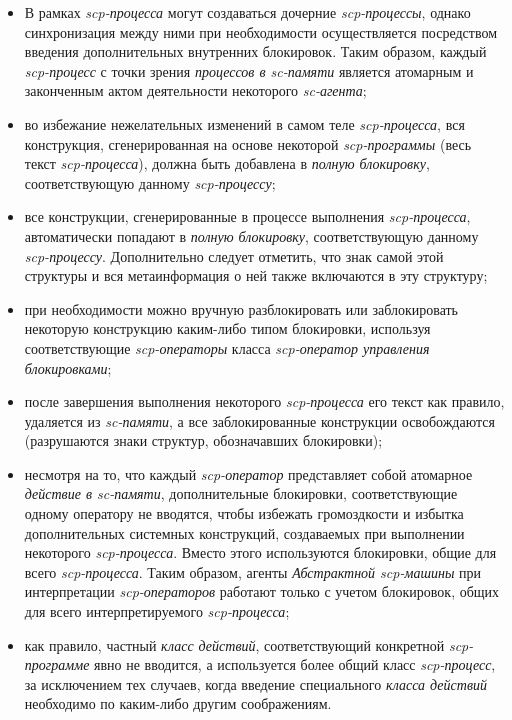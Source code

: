 \begin{frame}{}
\begin{itemize}
    \item В рамках \textit{scp-процесса} могут создаваться дочерние \textit{scp-процессы}, однако синхронизация между ними при необходимости осуществляется посредством введения дополнительных внутренних блокировок. Таким образом, каждый \textit{scp-процесс} с точки зрения \textit{процессов в sc-памяти} является атомарным и законченным актом деятельности некоторого \textit{sc-агента};
    \item во избежание нежелательных изменений в самом теле \textit{scp-процесса}, вся конструкция, сгенерированная на основе некоторой \textit{scp-программы} (весь текст \textit{scp-процесса}), должна быть добавлена в \textit{полную блокировку}, соответствующую данному \textit{scp-процессу};
\end{itemize}
\end{frame}

\begin{frame}{}
\begin{itemize}
\item все конструкции, сгенерированные в процессе выполнения \textit{scp-процесса}, автоматически попадают в \textit{полную 	блокировку}, соответствующую данному \textit{scp-процессу}. Дополнительно следует отметить, что знак самой этой структуры и вся метаинформация о ней также включаются в эту структуру;
\item при необходимости можно вручную разблокировать или заблокировать некоторую конструкцию каким-либо типом блокировки, используя соответствующие \textit{scp-операторы} класса \textit{scp-оператор управления блокировками};
\item после завершения выполнения некоторого \textit{scp-процесса} его текст как правило, удаляется из \textit{\mbox{sc-памяти}}, а все заблокированные конструкции освобождаются (разрушаются знаки структур, обозначавших блокировки);
\end{itemize}
\end{frame}

\begin{frame}{}
\begin{itemize}
\item несмотря на то, что каждый \textit{scp-оператор} представляет собой атомарное \textit{действие в sc-памяти}, дополнительные блокировки, соответствующие одному оператору не вводятся, чтобы избежать громоздкости и избытка дополнительных системных конструкций, создаваемых при выполнении некоторого \textit{scp-процесса}. Вместо этого используются блокировки, общие для всего \textit{scp-процесса}. Таким образом, агенты \textit{Абстрактной scp-машины} при интерпретации \textit{scp-операторов} работают только с учетом блокировок, общих для всего интерпретируемого \textit{scp-процесса};
\item как правило, частный \textit{класс действий}, соответствующий конкретной \textit{scp-программе} явно не вводится, а используется более общий класс \textit{scp-процесс}, за исключением тех случаев, когда введение специального \textit{класса действий} необходимо по каким-либо другим соображениям.
\end{itemize}
\end{frame}